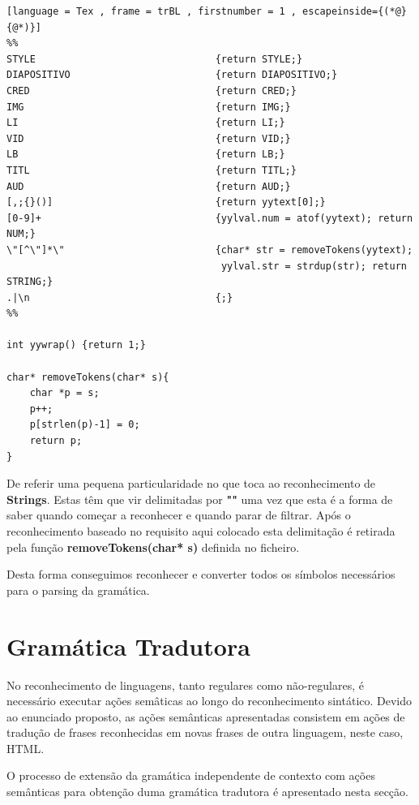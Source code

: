 \documentclass[11pt,a4paper]{report}
\begin{document}
\begin{lstlisting}[language = Tex , frame = trBL , firstnumber = 1 , escapeinside={(*@}{@*)}]
%%
STYLE                               {return STYLE;}
DIAPOSITIVO                         {return DIAPOSITIVO;}
CRED                                {return CRED;}
IMG                                 {return IMG;}
LI                                  {return LI;}
VID                                 {return VID;}
LB                                  {return LB;}
TITL                                {return TITL;}
AUD                                 {return AUD;}
[,;{}()]                            {return yytext[0];}
[0-9]+                              {yylval.num = atof(yytext); return NUM;}
\"[^\"]*\"                          {char* str = removeTokens(yytext);
				      				 yylval.str = strdup(str); return STRING;}
.|\n                                {;}
%%

int yywrap() {return 1;}

char* removeTokens(char* s){
    char *p = s;
    p++;
    p[strlen(p)-1] = 0;
    return p;
}
\end{lstlisting}

\vspace{0.5cm}

De referir uma pequena particularidade no que toca ao reconhecimento de \textbf{Strings}. Estas têm que vir delimitadas por \textbf{""} uma vez que esta é a forma de saber quando começar a reconhecer e quando parar de filtrar. Após o reconhecimento baseado no requisito aqui colocado esta delimitação é retirada pela função \textbf{removeTokens(char* s)} definida no ficheiro.

Desta forma conseguimos reconhecer e converter todos os símbolos necessários para o parsing da gramática.


\newpage

\section{Gramática Tradutora}

No reconhecimento de linguagens, tanto regulares como não-regulares, é necessário executar ações semâticas ao longo do reconhecimento sintático. Devido ao enunciado proposto, as ações semânticas apresentadas consistem em ações de tradução de frases reconhecidas em novas frases de outra linguagem, neste caso, HTML.

O processo de extensão da gramática independente de contexto com ações semânticas para obtenção duma gramática tradutora é apresentado nesta secção.
\end{document}
